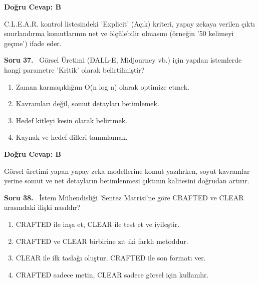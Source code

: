 \documentclass[11pt,a4paper,openany]{book}
\begin{document}
\vspace{4pt}
\begin{tcolorbox}[title=Cevap ve Açıklama, colback=gray!3!white, colframe=primarycolor!90!black, arc=2mm, fonttitle=\bfseries\sffamily, top=6pt, bottom=6pt]
    \textbf{Doğru Cevap: B}

    \vspace{2pt}
    C.L.E.A.R. kontrol listesindeki 'Explicit' (Açık) kriteri, yapay zekaya verilen çıktı sınırlandırma komutlarının net ve ölçülebilir olmasını (örneğin '50 kelimeyi geçme') ifade eder.
\end{tcolorbox}
\vspace{10pt}
\needspace{5cm}
\vspace{8pt}
\noindent\textbf{\large\sffamily Soru 37.} \ Görsel Üretimi (DALL-E, Midjourney vb.) için yapılan istemlerde hangi parametre 'Kritik' olarak belirtilmiştir?

\begin{enumerate}[label=\Alph*), leftmargin=25pt, topsep=4pt, itemsep=2pt]
        \item Zaman karmaşıklığını O(n log n) olarak optimize etmek.
        \item Kavramları değil, somut detayları betimlemek.
        \item Hedef kitleyi kesin olarak belirtmek.
        \item Kaynak ve hedef dilleri tanımlamak.
\end{enumerate}

\vspace{4pt}
\begin{tcolorbox}[title=Cevap ve Açıklama, colback=gray!3!white, colframe=primarycolor!90!black, arc=2mm, fonttitle=\bfseries\sffamily, top=6pt, bottom=6pt]
    \textbf{Doğru Cevap: B}

    \vspace{2pt}
    Görsel üretimi yapan yapay zeka modellerine komut yazılırken, soyut kavramlar yerine somut ve net detayların betimlenmesi çıktının kalitesini doğrudan artırır.
\end{tcolorbox}
\vspace{10pt}
\needspace{5cm}
\vspace{8pt}
\noindent\textbf{\large\sffamily Soru 38.} \ İstem Mühendisliği 'Sentez Matrisi'ne göre CRAFTED ve CLEAR arasındaki ilişki nasıldır?

\begin{enumerate}[label=\Alph*), leftmargin=25pt, topsep=4pt, itemsep=2pt]
        \item CRAFTED ile inşa et, CLEAR ile test et ve iyileştir.
        \item CRAFTED ve CLEAR birbirine zıt iki farklı metoddur.
        \item CLEAR ile ilk taslağı oluştur, CRAFTED ile son formatı ver.
        \item CRAFTED sadece metin, CLEAR sadece görsel için kullanılır.
\end{enumerate}
\end{document}
